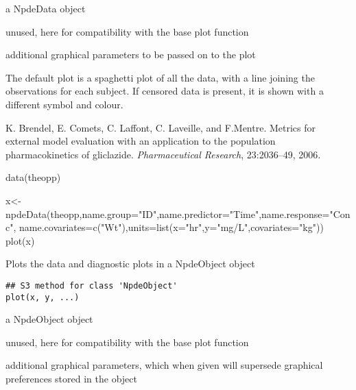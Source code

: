 \documentclass[a4paper]{book}
\begin{document}
%
\begin{Arguments}
\begin{ldescription}
\item[\code{x}] a NpdeData object

\item[\code{y}] unused, here for compatibility with the base plot function

\item[\code{...}] additional graphical parameters to be passed on to the plot
\end{ldescription}
\end{Arguments}
%
\begin{Details}\relax
The default plot is a spaghetti plot of all the data, with a line joining the observations for each subject. If censored data is present, it is shown with a different symbol and colour.
\end{Details}
%
\begin{References}\relax
K. Brendel, E. Comets, C. Laffont, C. Laveille, and F.Mentre. Metrics for external model evaluation with an application to the population pharmacokinetics of gliclazide. \emph{Pharmaceutical Research}, 23:2036--49, 2006.
\end{References}
%
\begin{SeeAlso}\relax
{}
\end{SeeAlso}
%
\begin{Examples}
\begin{ExampleCode}

data(theopp)

x<-npdeData(theopp,name.group="ID",name.predictor="Time",name.response="Conc", 
name.covariates=c("Wt"),units=list(x="hr",y="mg/L",covariates="kg"))
plot(x)

\end{ExampleCode}
\end{Examples}
%
\begin{Description}\relax
Plots the data and diagnostic plots in a NpdeObject object
\end{Description}
%
\begin{Usage}
\begin{verbatim}
## S3 method for class 'NpdeObject'
plot(x, y, ...)
\end{verbatim}
\end{Usage}
%
\begin{Arguments}
\begin{ldescription}
\item[\code{x}] a NpdeObject object

\item[\code{y}] unused, here for compatibility with the base plot function

\item[\code{...}] additional graphical parameters, which when given will supersede graphical preferences stored in the object
\end{ldescription}
\end{Arguments}
\end{document}

